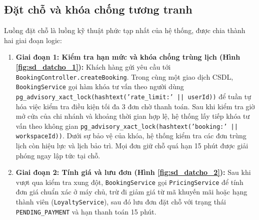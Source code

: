 
\subsection{Đặt chỗ và khóa chống tương tranh}
\label{ssec:seq_datcho}
Luồng đặt chỗ là luồng kỹ thuật phức tạp nhất của hệ thống, được chia thành hai giai đoạn logic:
\begin{enumerate}
    \item \textbf{Giai đoạn 1: Kiểm tra hạn mức và khóa chống trùng lịch (Hình \ref{fig:sd_datcho_1}):} Khách hàng gửi yêu cầu tới \texttt{BookingController.createBooking}. Trong cùng một giao dịch CSDL, \texttt{BookingService} gọi hàm khóa tư vấn theo người dùng \texttt{pg\_advisory\_xact\_lock(hashtext('rate\_limit:' || userId))} để tuần tự hóa việc kiểm tra điều kiện tối đa 3 đơn chờ thanh toán. Sau khi kiểm tra giờ mở cửa của chi nhánh và khoảng thời gian hợp lệ, hệ thống lấy tiếp khóa tư vấn theo không gian \texttt{pg\_advisory\_xact\_lock(hashtext('booking:' || workspaceId))}. Dưới sự bảo vệ của khóa, hệ thống kiểm tra các đơn trùng lịch còn hiệu lực và lịch bảo trì. Mọi đơn giữ chỗ quá hạn 15 phút được giải phóng ngay lập tức tại chỗ.
    \item \textbf{Giai đoạn 2: Tính giá và lưu đơn (Hình \ref{fig:sd_datcho_2}):} Sau khi vượt qua kiểm tra xung đột, \texttt{BookingService} gọi \texttt{PricingService} để tính đơn giá chuẩn xác ở máy chủ, trừ đi giảm giá từ mã khuyến mãi hoặc hạng thành viên (\texttt{LoyaltyService}), sau đó lưu đơn đặt chỗ với trạng thái \texttt{PENDING\_PAYMENT} và hạn thanh toán 15 phút.
\end{enumerate}


